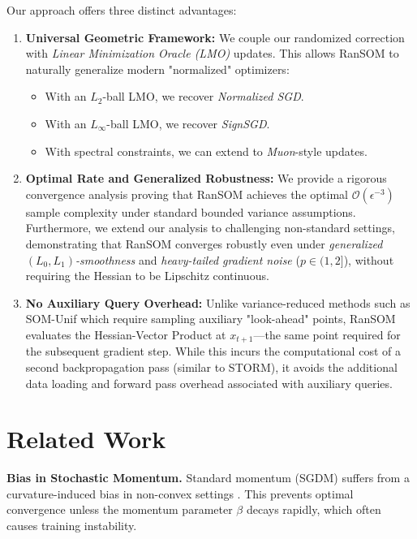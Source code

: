\documentclass{article}
\theoremstyle{plain}
\theoremstyle{definition}
\theoremstyle{remark}
\begin{document}
Our approach offers three distinct advantages:

\begin{enumerate}
    \item \textbf{Universal Geometric Framework:} We couple our randomized correction with \textit{Linear Minimization Oracle (LMO)} updates. This allows RanSOM to naturally generalize modern "normalized" optimizers:
    \begin{itemize}
        \item With an $L_2$-ball LMO, we recover \textit{Normalized SGD}.
        \item With an $L_\infty$-ball LMO, we recover \textit{SignSGD}.
        \item With spectral constraints, we can extend to \textit{Muon}-style updates.
    \end{itemize}
    
    \item \textbf{Optimal Rate and Generalized Robustness:} We provide a rigorous convergence analysis proving that RanSOM achieves the optimal $\mathcal{O}(\epsilon^{-3})$ sample complexity under standard bounded variance assumptions. Furthermore, we extend our analysis to challenging non-standard settings, demonstrating that RanSOM converges robustly even under \textit{generalized $(L_0, L_1)$-smoothness} and \textit{heavy-tailed gradient noise} ($p \in (1, 2]$), without requiring the Hessian to be Lipschitz continuous.
    \item \textbf{No Auxiliary Query Overhead:} Unlike variance-reduced methods such as SOM-Unif which require sampling auxiliary "look-ahead" points, RanSOM evaluates the Hessian-Vector Product at $x_{t+1}$—the same point required for the subsequent gradient step. While this incurs the computational cost of a second backpropagation pass (similar to STORM), it avoids the additional data loading and forward pass overhead associated with auxiliary queries.
\end{enumerate}

\section{Related Work}
\label{sec:related_work}

\textbf{Bias in Stochastic Momentum.} 
Standard momentum (SGDM) \cite{polyak1964, sutskever2013importance} suffers from a curvature-induced bias in non-convex settings \cite{yuan2016convergence}. This prevents optimal convergence unless the momentum parameter $\beta$ decays rapidly, which often causes training instability.
\end{document}
